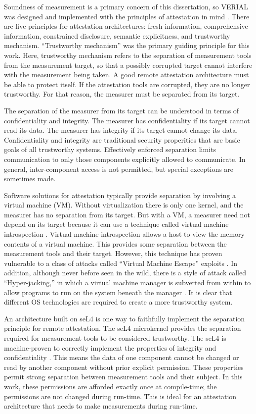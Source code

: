 \documentclass[a4paper,twoside]{article}
\begin{document}
Soundness of measurement is a primary concern of this dissertation, so VERIAL was designed and implemented with the principles of attestation in mind \cite{Principles}. There are five principles for attestation architectures: fresh information, comprehensive information, constrained disclosure, semantic explicitness, and trustworthy mechanism. ``Trustworthy mechanism'' was the primary guiding principle for this work. Here, trustworthy mechanism refers to the separation of measurement tools from the measurement target, so that a possibly corrupted target cannot interfere with the measurement being taken. A good remote attestation architecture must be able to protect itself. If the attestation tools are corrupted, they are no longer trustworthy. For that reason, the measurer must be separated from its target.

The separation of the measurer from its target can be understood in terms of confidentiality and integrity. The measurer has confidentiality if its target cannot read its data. The measurer has integrity if its target cannot change its data. Confidentiality and integrity are traditional security properities that are basic goals of all trustworthy systems. Effectively enforced separation limits communication to only those components explicitly allowed to communicate. In general, inter-component access is not permitted, but special exceptions are sometimes made.

Software solutions for attestation typically provide separation by involving a virtual machine (VM). Without virtualization there is only one kernel, and the measurer has no separation from its target. But with a VM, a measurer need not depend on its target because it can use a technique called virtual machine introspection \cite{VMIntro}. Virtual machine introspection allows a host to view the memory contents of a virtual machine. This provides some separation between the measurement tools and their target. However, this technique has proven vulnerable to a class of attacks called ``Virtual Machine Escape'' exploits \cite{VMEscape}. In addition, although never before seen in the wild, there is a style of attack called ``Hyper-jacking,'' in which a virtual machine manager is subverted from within to allow programs to run on the system beneath the manager \cite{Hyperjacking}. It is clear that different OS technologies are required to create a more trustworthy system.

An architecture built on seL4 \cite{sel4paper} is one way to faithfully implement the separation principle for remote attestation. The seL4 microkernel provides the separation required for measurement tools to be considered trustworthy. The seL4 is machine-proven to correctly implement the properties of integrity and confidentiality \cite{seL4Proof}. This means the data of one component cannot be changed or read by another component without prior explicit permission. These properties permit strong separation between measurement tools and their subject. In this work, these permissions are afforded exactly once at compile-time; the permissions are not changed during run-time. This is ideal for an attestation architecture that needs to make measurements during run-time. 
\end{document}
